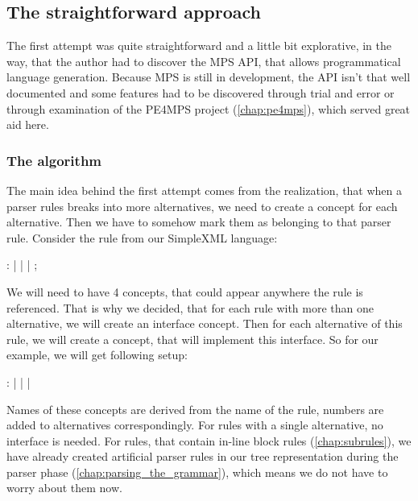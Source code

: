 \subsection{The straightforward approach}
\label{chap:straightforward_approach}

The first attempt was quite straightforward and a little bit explorative, in the way, that the author had to discover the MPS API, that allows programmatical language generation.
Because MPS is still in development, the API isn't that well documented and some features had to be discovered through trial and error or through examination of the PE4MPS project (\ref{chap:pe4mps}), which served great aid here.

\subsubsection{The algorithm}
\label{chap:straight_algorithm}
The main idea behind the first attempt comes from the realization, that when a parser rules breaks into more alternatives, we need to create a concept for each alternative.
Then we have to somehow mark them as belonging to that parser rule.
Consider the  rule from our SimpleXML language:

\begin{antlr}
	    :   
           |   
           |   
           |   
           ;
\end{antlr}

We will need to have 4 concepts, that could appear anywhere the  rule is referenced.
That is why we decided, that for each rule with more than one alternative, we will create an interface concept.
Then for each alternative of this rule, we will create a concept, that will implement this interface.
So for our  example, we will get following setup:

\begin{antlr}
	   :   
           |   
           |   
           |   
\end{antlr}

Names of these concepts are derived from the name of the rule, numbers are added to alternatives correspondingly. For rules with a single alternative, no interface is needed. For rules, that contain in-line block rules (\ref{chap:subrules}), we have already created artificial parser rules in our tree representation during the parser phase (\ref{chap:parsing_the_grammar}), which means we do not have to worry about them now.
\\

